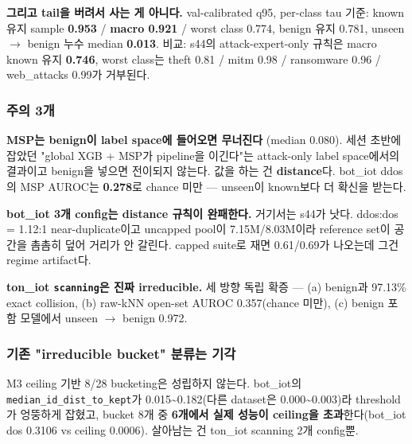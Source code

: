 \textbf{그리고 tail을 버려서 사는 게 아니다.} val-calibrated q95, per-class tau 기준: known 유지 sample \textbf{0.953} /\allowbreak{} \textbf{macro 0.921} /\allowbreak{} worst class 0.774, benign 유지 0.781, unseen \ensuremath{\rightarrow} benign 누수 median \textbf{0.013}. 비교: s44의 attack-expert-only 규칙은 macro known 유지 \textbf{0.746}, worst class는 theft 0.81 /\allowbreak{} mitm 0.98 /\allowbreak{} ransomware 0.96 /\allowbreak{} web\_\allowbreak{}attacks 0.99가 거부된다.

\subsubsection{주의 3개}
\par\noindent \textbullet\enspace \textbf{MSP는 benign이 label space에 들어오면 무너진다} (median 0.080). 세션 초반에 잡았던 "global XGB +\allowbreak{} MSP가 pipeline을 이긴다"는 attack-only label space에서의 결과이고 benign을 넣으면 전이되지 않는다. 값을 하는 건 \textbf{distance}다. bot\_\allowbreak{}iot ddos의 MSP AUROC는 \textbf{0.278}로 chance 미만 — unseen이 known보다 더 확신을 받는다.


\par\noindent \textbullet\enspace \textbf{bot\_\allowbreak{}iot 3개 config는 distance 규칙이 완패한다.} 거기서는 s44가 낫다. ddos:dos =\allowbreak{} 1.12:1 near-duplicate이고 uncapped pool이 7.15M/\allowbreak{}8.03M이라 reference set이 공간을 촘촘히 덮어 거리가 안 갈린다. capped suite로 재면 0.61/\allowbreak{}0.69가 나오는데 그건 regime artifact다.


\par\noindent \textbullet\enspace \textbf{ton\_\allowbreak{}iot \texttt{scanning\allowbreak{}}은 진짜 irreducible.} 세 방향 독립 확증 — (a) benign과 97.13\% exact collision, (b) raw-kNN open-set AUROC 0.357(chance 미만), (c) benign 포함 모델에서 unseen \ensuremath{\rightarrow} benign 0.972.


\subsubsection{기존 "irreducible bucket" 분류는 기각}
M3 ceiling 기반 8/\allowbreak{}28 bucketing은 성립하지 않는다. bot\_\allowbreak{}iot의 \texttt{median\_\allowbreak{}\allowbreak{}i\allowbreak{}d\_\allowbreak{}\allowbreak{}dist\_\allowbreak{}\allowbreak{}t\allowbreak{}o\_\allowbreak{}\allowbreak{}kept}가 0.015\textasciitilde{}0.182(다른 dataset은 0.000\textasciitilde{}0.003)라 threshold가 엉뚱하게 잡혔고, bucket 8개 중 \textbf{6개에서 실제 성능이 ceiling을 초과}한다(bot\_\allowbreak{}iot dos 0.3106 vs ceiling 0.0006). 살아남는 건 ton\_\allowbreak{}iot scanning 2개 config뿐.

